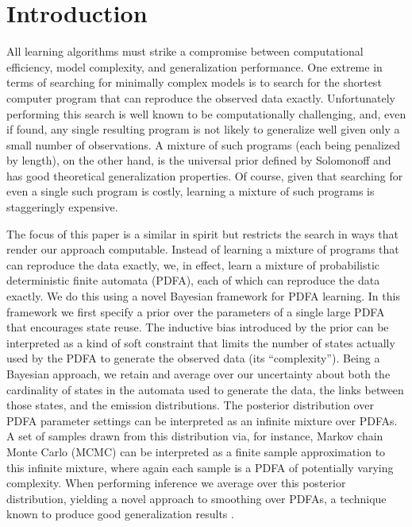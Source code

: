 \section{Introduction}
All learning algorithms must strike a compromise between computational efficiency, model complexity, and generalization performance.  One extreme in terms of searching for minimally complex models is to search for the shortest computer program that can reproduce the observed data exactly. Unfortunately performing this search is well known to be computationally challenging, and, even if found, any single resulting program is not likely to generalize well given only a small number of observations.   A mixture of such programs (each being penalized by length), on the other hand, is the universal prior defined by Solomonoff \cite{Solomonoff1964,Solomonoff1978} and has good theoretical generalization properties.  Of course, given that searching for even a single such program is costly, learning a mixture of such programs is staggeringly expensive.  

The focus of this paper is a similar in spirit but restricts the search in ways that render our approach computable.  Instead of learning a mixture of programs that can reproduce the data exactly, we, in effect, learn a mixture of probabilistic deterministic finite automata (PDFA), each of which can reproduce the data exactly.   We do this using a novel Bayesian framework for PDFA learning.  In this framework we first specify a prior over the parameters of a single large PDFA that encourages state reuse.  The inductive bias introduced by the prior can be interpreted as a kind of soft constraint that limits the number of states actually used by the PDFA to generate the observed data (its ``complexity'').   Being a Bayesian approach, we retain and average over our uncertainty about both the cardinality of states in the automata used to generate the data, the links between those states, and the emission distributions.  The posterior distribution over PDFA parameter settings can be interpreted as an infinite mixture over PDFAs.  A set of samples drawn from this distribution via, for instance, Markov chain Monte Carlo (MCMC) can be interpreted as a finite sample approximation to this infinite mixture, where again each sample is a PDFA of potentially varying complexity.  When performing inference we average over this posterior distribution, yielding a novel approach to smoothing over PDFAs, a technique known to produce good generalization results  \cite{pdfa_smoothing_approaches}. %

